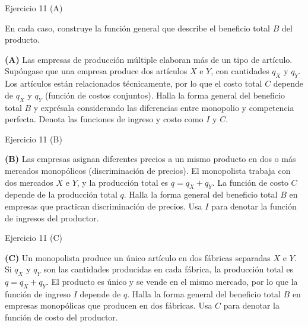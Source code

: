 \documentclass[aspectratio=169]{beamer}
\begin{document}
\begin{frame}{Ejercicio 11 (A)}
  \begin{mwejercicio}
    En cada caso, construye la función general que describe el beneficio total
    \(B\) del producto.

    \textbf{(A)} Las empresas de producción múltiple elaboran más de un tipo de
    artículo. Supóngase que una empresa produce dos artículos \(X\) e \(Y\), con
    cantidades \(q_X\) y \(q_Y\). Los artículos están relacionados técnicamente,
    por lo que el costo total \(C\) depende de \(q_X\) y \(q_Y\) (función de
    costos conjuntos). Halla la forma general del beneficio total \(B\) y
    exprésala considerando las diferencias entre monopolio y competencia
    perfecta. Denota las funciones de ingreso y costo como \(I\) y \(C\).
  \end{mwejercicio}
\end{frame}

\begin{frame}{Ejercicio 11 (B)}
  \begin{mwejercicio}
    \textbf{(B)} Las empresas asignan diferentes precios a un mismo producto en
    dos o más mercados monopólicos (discriminación de precios). El monopolista
    trabaja con dos mercados \(X\) e \(Y\), y la producción total es
    \(q=q_X+q_Y\). La función de costo \(C\) depende de la producción total
    \(q\). Halla la forma general del beneficio total \(B\) en empresas que
    practican discriminación de precios. Usa \(I\) para denotar la función de
    ingresos del productor.
  \end{mwejercicio}
\end{frame}

\begin{frame}{Ejercicio 11 (C)}
  \begin{mwejercicio}
    \textbf{(C)} Un monopolista produce un único artículo en dos fábricas
    separadas \(X\) e \(Y\). Si \(q_X\) y \(q_Y\) son las cantidades producidas
    en cada fábrica, la producción total es \(q=q_X+q_Y\). El producto es único
    y se vende en el mismo mercado, por lo que la función de ingreso \(I\)
    depende de \(q\). Halla la forma general del beneficio total \(B\) en
    empresas monopólicas que producen en dos fábricas. Usa \(C\) para denotar
    la función de costo del productor.
  \end{mwejercicio}
\end{frame}
\end{document}
